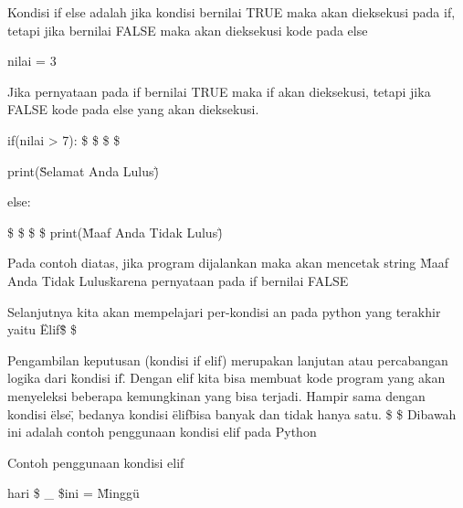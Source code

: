 \noindent 
Kondisi if else adalah jika kondisi bernilai TRUE maka akan dieksekusi pada if, tetapi jika bernilai FALSE maka akan dieksekusi kode pada else \par
\noindent 
\vspace{\baselineskip}
nilai = 3\vspace{\baselineskip}
 \par
\noindent 
Jika pernyataan pada if bernilai TRUE maka if akan dieksekusi, tetapi jika FALSE kode pada else yang akan dieksekusi.\vspace{\baselineskip}
 \par
\noindent 
if(nilai > 7):\vspace{\baselineskip}
 \$  \$  \$  \$ \par
\noindent 
 print(\"Selamat Anda Lulus\")\vspace{\baselineskip}
 \par
\noindent 
else:\vspace{\baselineskip}
 \par
\noindent 
 \$  \$  \$  \$ print(\"Maaf Anda Tidak Lulus\") \par
\noindent 
\vspace{\baselineskip}
\vspace{\baselineskip}
Pada contoh diatas, jika program dijalankan maka akan mencetak string \"Maaf Anda Tidak Lulus\" karena pernyataan pada if bernilai FALSE \par
\noindent 
\vspace{\baselineskip}
Selanjutnya kita akan mempelajari per-kondisi an pada python yang terakhir yaitu \"Elif\" \$  \$ \par
\vspace{12pt}
\noindent 
Pengambilan keputusan (kondisi if elif) merupakan lanjutan atau percabangan logika dari \"kondisi if\". Dengan elif kita bisa membuat kode program yang akan menyeleksi beberapa kemungkinan yang bisa terjadi. Hampir sama dengan kondisi \"else\", bedanya kondisi \"elif\" bisa banyak dan tidak hanya satu. \$  \$\vspace{\baselineskip}
\vspace{\baselineskip}
Dibawah ini adalah contoh penggunaan kondisi elif pada Python \par
\vspace{12pt}
\noindent 
Contoh penggunaan kondisi elif \par
\vspace{12pt}
\noindent 
hari \$  \_  \$ini = \"Minggu\" \par
\noindent 
\vspace{\baselineskip}
